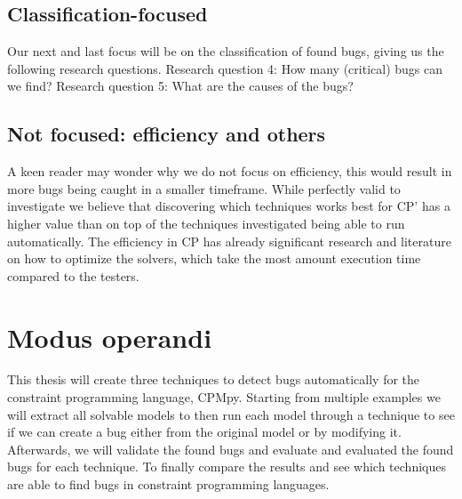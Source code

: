 
\subsection{Classification-focused}
\label{intro:RQ:ClassificationFocused}
Our next and last focus will be on the classification of found bugs, giving us the following research questions. \newline
Research question 4: How many (critical) bugs can we find? \newline
Research question 5: What are the causes of the bugs? \newline

\subsection{Not focused: efficiency and others}
\label{intro:RQ:NotFocused}
A keen reader may wonder why we do not focus on efficiency, this would result in more bugs being caught in a smaller timeframe. While perfectly valid to investigate we believe that discovering which techniques works best for CP' has a higher value than on top of the techniques investigated being able to run automatically. The efficiency in CP has already significant research and literature on how to optimize the solvers, which take the most amount execution time compared to the testers.



\section{Modus operandi}
This thesis will create three techniques to detect bugs automatically for the constraint programming language, CPMpy. Starting from multiple examples we will extract all solvable models to then run each model through a technique to see if we can create a bug either from the original model or by modifying it. Afterwards, we will validate the found bugs and evaluate and evaluated the found bugs for each technique. To finally compare the results and see which techniques are able to find bugs in constraint programming languages.


